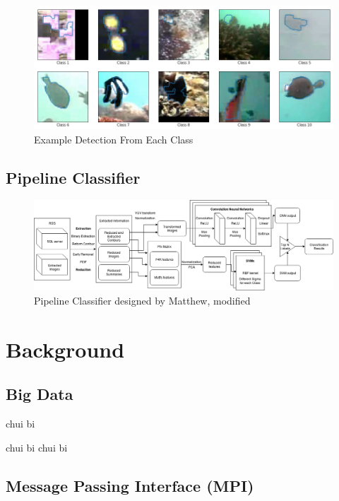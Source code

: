 \documentclass[bsc,logo,twoside,fullspacing,parskip]{infthesis}
\begin{document}
\begin{figure}[!b]
    \centering
    \includegraphics[scale=0.44]{graph/class_sample.png}
    \caption{Example Detection From Each Class}
    \label{fig:classes}
\end{figure}

\section{Pipeline Classifier}

\begin{figure}[!b]
    \centering
    \includegraphics[scale=0.34]{graph/Pipeline_Classifier.png}
    \caption{Pipeline Classifier designed by Matthew, modified}
    \label{fig:pipeline}
\end{figure}

\chapter{Background}


\section{Big Data}

chui bi

chui bi
chui bi

\section{Message Passing Interface (MPI)}
\end{document}
